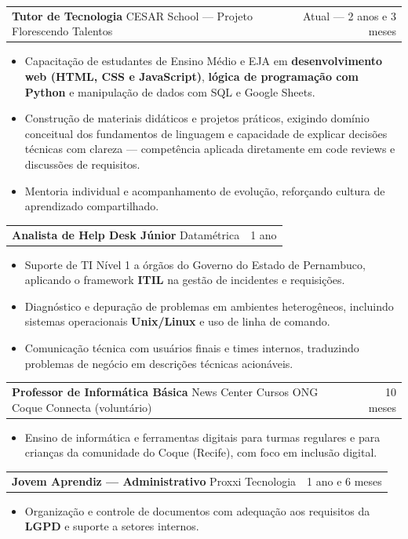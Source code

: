 \documentclass[a4paper,10.5pt]{article}
\makeatletter
\newcommand{\cargo}[3]{%
  \vspace{2pt}
  \begin{tabularx}{\textwidth}{@{}Xr@{}}
    \textbf{#1} \textnormal{\textbar{} #2} & \textcolor{muted}{#3}
  \end{tabularx}%
  \vspace{1pt}
}
\makeatother
\begin{document}
\cargo{Tutor de Tecnologia}{CESAR School --- Projeto Florescendo Talentos}{Atual --- 2 anos e 3 meses}
\begin{itemize}
  \item Capacitação de estudantes de Ensino Médio e EJA em \textbf{desenvolvimento web (HTML, CSS e JavaScript)}, \textbf{lógica de programação com Python} e manipulação de dados com SQL e Google Sheets.
  \item Construção de materiais didáticos e projetos práticos, exigindo domínio conceitual dos fundamentos de linguagem e capacidade de explicar decisões técnicas com clareza --- competência aplicada diretamente em code reviews e discussões de requisitos.
  \item Mentoria individual e acompanhamento de evolução, reforçando cultura de aprendizado compartilhado.
\end{itemize}

\cargo{Analista de Help Desk Júnior}{Datamétrica}{1 ano}
\begin{itemize}
  \item Suporte de TI Nível 1 a órgãos do Governo do Estado de Pernambuco, aplicando o framework \textbf{ITIL} na gestão de incidentes e requisições.
  \item Diagnóstico e depuração de problemas em ambientes heterogêneos, incluindo sistemas operacionais \textbf{Unix/Linux} e uso de linha de comando.
  \item Comunicação técnica com usuários finais e times internos, traduzindo problemas de negócio em descrições técnicas acionáveis.
\end{itemize}

\cargo{Professor de Informática Básica}{News Center Cursos \textbar{} ONG Coque Connecta (voluntário)}{10 meses}
\begin{itemize}
  \item Ensino de informática e ferramentas digitais para turmas regulares e para crianças da comunidade do Coque (Recife), com foco em inclusão digital.
\end{itemize}

\cargo{Jovem Aprendiz --- Administrativo}{Proxxi Tecnologia}{1 ano e 6 meses}
\begin{itemize}
  \item Organização e controle de documentos com adequação aos requisitos da \textbf{LGPD} e suporte a setores internos.
\end{itemize}

\end{document}
